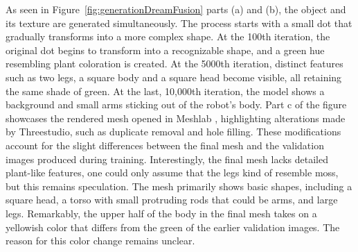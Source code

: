 As seen in Figure~\ref{fig:generationDreamFusion} parts (a) and (b), the object and its texture are generated simultaneously. The process starts with a small dot that gradually transforms into a more complex shape. At the 100th iteration, the original dot begins to transform into a recognizable shape, and a green hue resembling plant coloration is created. At the 5000th iteration, distinct features such as two legs, a square body and a square head become visible, all retaining the same shade of green. At the last, 10,000th iteration, the model shows a background and small arms sticking out of the robot's body.
Part c of the figure showcases the rendered mesh opened in Meshlab \citep{meshLab}, highlighting alterations made by Threestudio, such as duplicate removal and hole filling. These modifications account for the slight differences between the final mesh and the validation images produced during training. Interestingly, the final mesh lacks detailed plant-like features, one could only assume that the legs kind of resemble moss, but this remains speculation. The mesh primarily shows basic shapes, including a square head, a torso with small protruding rods that could be arms, and large legs. Remarkably, the upper half of the body in the final mesh takes on a yellowish color that differs from the green of the earlier validation images. The reason for this color change remains unclear.\newline